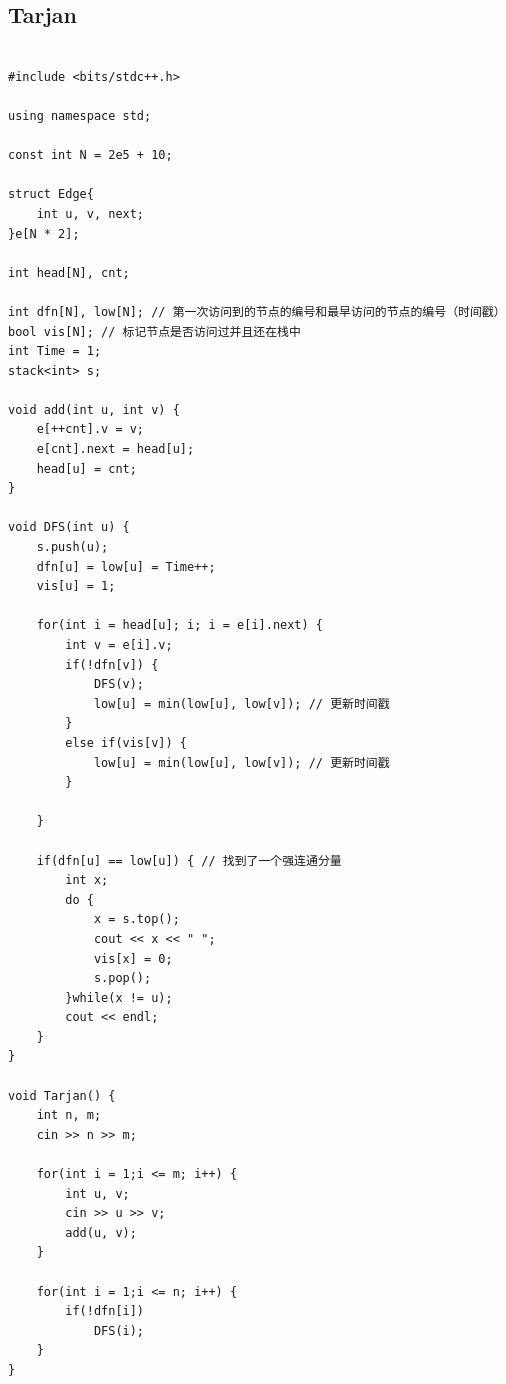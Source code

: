 \documentclass[twoside]{article}
\begin{document}
\subsection{Tarjan}
\begin{lstlisting}

#include <bits/stdc++.h>

using namespace std;

const int N = 2e5 + 10;

struct Edge{
    int u, v, next;
}e[N * 2];

int head[N], cnt;

int dfn[N], low[N]; // 第一次访问到的节点的编号和最早访问的节点的编号（时间戳）
bool vis[N]; // 标记节点是否访问过并且还在栈中
int Time = 1;
stack<int> s;

void add(int u, int v) {
    e[++cnt].v = v;
    e[cnt].next = head[u];
    head[u] = cnt;
}

void DFS(int u) {
    s.push(u);
    dfn[u] = low[u] = Time++;
    vis[u] = 1;

    for(int i = head[u]; i; i = e[i].next) {
        int v = e[i].v;
        if(!dfn[v]) {
            DFS(v);
            low[u] = min(low[u], low[v]); // 更新时间戳
        }
        else if(vis[v]) {
            low[u] = min(low[u], low[v]); // 更新时间戳
        }

    }

    if(dfn[u] == low[u]) { // 找到了一个强连通分量
        int x;
        do {
            x = s.top();
            cout << x << " ";
            vis[x] = 0;
            s.pop();
        }while(x != u);
        cout << endl;
    }
}

void Tarjan() {
    int n, m;
    cin >> n >> m;

    for(int i = 1;i <= m; i++) {
        int u, v;
        cin >> u >> v;
        add(u, v);
    }
    
    for(int i = 1;i <= n; i++) {
        if(!dfn[i])
            DFS(i);
    }
}

\end{lstlisting}
\end{document}
